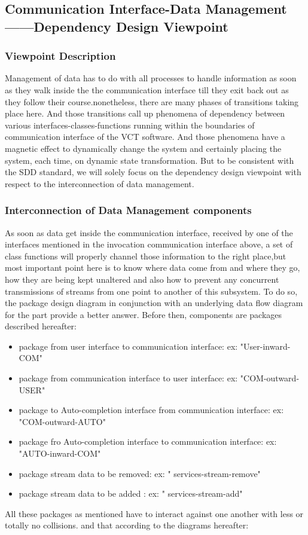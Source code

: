 \documentclass [10pt]{article}
\begin{document}
\subsection{\textbf{Communication Interface-Data Management------Dependency  Design Viewpoint }}

\subsubsection{Viewpoint Description}
Management of data has to do with all processes to handle information as soon as they walk inside the the communication interface till they exit back out as they follow their course.nonetheless, there are many phases of transitions taking place here. And those transitions call up phenomena of dependency between various interfaces-classes-functions running within the boundaries of communication interface of the VCT software. And those phenomena have a magnetic effect to dynamically change the system and certainly placing the system, each time, on dynamic state transformation. But to be consistent with the SDD standard, we will solely focus on the dependency design viewpoint with respect to the interconnection of data management.\par 

\subsubsection{Interconnection of Data Management components}
As soon as data get inside the communication interface, received by one of the interfaces mentioned in the invocation communication interface above, a set of class functions will properly channel those information to the right place,but most important point here is to know where data come from and where they go, how they are being kept unaltered and also how to prevent any concurrent transmissions of streams from one point to another of this subsystem. To do so, the package design diagram in conjunction with an underlying  data flow diagram for the part provide a better answer. Before then, components are packages described hereafter:
\begin{itemize}
\item package from user interface to  communication interface: ex: "User-inward-COM"
\item package from communication interface to user interface: ex: "COM-outward-USER"
\item package to Auto-completion interface from communication interface: ex: "COM-outward-AUTO"
\item package fro Auto-completion interface to communication interface: ex: "AUTO-inward-COM"
\item package stream data to be removed: ex: " services-stream-remove"
\item package stream data to be added : ex: " services-stream-add"
\end{itemize}
All these packages as mentioned have to interact against one another with less or totally no collisions. and that according to the diagrams hereafter:
\end{document}
